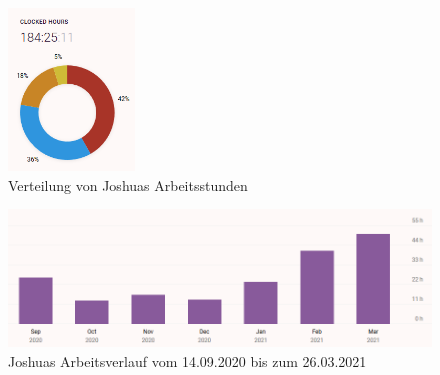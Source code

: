 \begin{figure}[H]
    \begin{center}
        \includegraphics[width=0.30\textwidth]{images/Appendix/Josh/clockedHours.png}
        \caption{Verteilung von Joshuas Arbeitsstunden}
    \end{center}
\end{figure}

\begin{figure}[H]
    \begin{center}
        \includegraphics[width=1\textwidth]{images/Appendix/Josh/timeline.png}
        \caption{Joshuas Arbeitsverlauf vom 14.09.2020 bis zum 26.03.2021}
    \end{center}
\end{figure}
